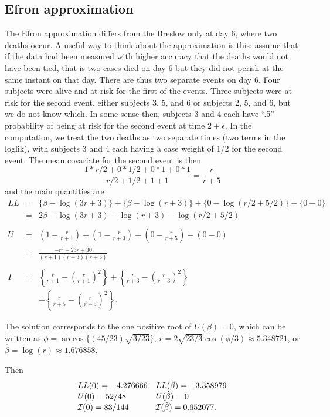 \documentclass[11pt]{article}
\def\bhat{\hat \beta}        %
\def\imat{{\cal I}}
\begin{document}
\subsection{Efron approximation}
The Efron approximation \cite{Efron77}
differs from the Breslow only at day 6, where two
deaths occur.  
A useful way to think about the approximation is this: assume that if the
data had been measured with higher accuracy that the deaths would not have been
tied, that is two cases died on day 6 but they did not perish at the
same instant on that day.  
There are thus two separate events on day 6.  Four subjects were alive and
at risk for the first of the events.  Three subjects were at risk for the
second event, either subjects 3, 5, and 6 or subjects 2, 5, and 6, but we
do not know which.  
In some sense then, subjects 3 and 4 each have ``.5'' probability of 
being at risk for the
second event at time $2 + \epsilon$.
In the computation, we treat the two deaths as two separate times (two terms
in the loglik), with subjects 3 and 4 each having a case weight of 1/2 for the
second event.
The mean covariate for the second event is then
$$
 \frac{1*r/2 + 0*1/2 + 0*1 + 0*1 }
      {r/2 + 1/2 + 1+1} =  \frac{r}{r+5}
$$
and the main quantities are
\begin{eqnarray*}
LL &=& \{\beta- \log(3r+3)\} + \{\beta - \log(r+3)\} + \{0-\log(r/2 +5/2)\} 
	+ \{0-0\}  \\
   &=& 2\beta - \log(3r+3) - \log(r+3) - \log(r/2 +5/2)\\ \\
U &=& \left(1-\frac{r}{r+1}\right) + \left(1-\frac{r}{r+3}\right) 
	+ \left(0-\frac{r}{r+5}\right) + (0-0) \\
  &=& \frac{-r^3 + 23r + 30}{(r+1)(r+3)(r+5)} \\ \\
I&=&     \left\{\frac{r}{r+1} - \left( \frac{r}{r+1} \right )^2\right\}
        + \left\{\frac{r}{r+3} - \left( \frac{r}{r+3} \right )^2\right\} \\
  &&    + \left\{\frac{r}{r+5} - \left( \frac{r}{r+5} \right )^2\right\}. 
\end{eqnarray*}

The solution corresponds to the one positive root of $U(\beta)=0$, which 
can be written as $\phi=\arccos\{(45/23)\sqrt{3/23}\}$, 
$r=2\sqrt{23/3}\cos(\phi/3) \approx 5.348721$,
or $\bhat = \log(r) \approx 1.676858$.
  
Then
$$
\begin{array}{ll}
 LL(0)=-4.276666 & LL(\bhat)=-3.358979 \\
 U(0) = 52/48 & U(\bhat) = 0 \\
 \imat(0) = 83/144  & \imat(\bhat) = 0.652077.
\end{array}
$$
\end{document}
